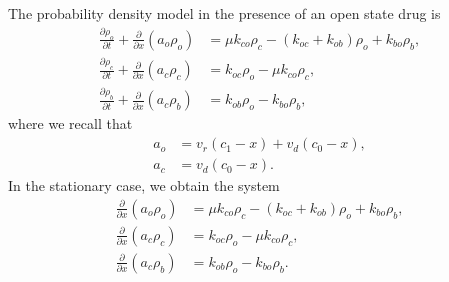 The probability density model in the presence of an open state drug is
\begin{align}
\frac{\partial\rho_{o}}{\partial t}+\frac{\partial}{\partial x}\left(
a_{o}\rho_{o}\right)   &  =\mu k_{co}\rho_{c}-(k_{oc}+k_{ob})\rho_{o}+k_{bo}\rho_{b},\\
\frac{\partial\rho_{c}}{\partial t}+\frac{\partial}{\partial x}\left(
a_{c}\rho_{c}\right)   &  =k_{oc}\rho_{o}-\mu k_{co}\rho_{c},\\
\frac{\partial\rho_{b}}{\partial t}+\frac{\partial}{\partial x}\left(
a_{c}\rho_{b}\right)   &  =k_{ob}\rho_{o}-k_{bo}\rho_{b},
\end{align}
where we recall that 
\begin{align*}
a_{o} &  =v_{r}(c_{1}-x)+v_{d}(c_{0}-x),\\
a_{c} &  =v_{d}(c_{0}-x).
\end{align*}
In the stationary case, we obtain the system%
\begin{align}
\frac{\partial}{\partial x}\left(
a_{o}\rho_{o}\right)   &  =\mu k_{co}\rho_{c}-(k_{oc}+k_{ob})\rho_{o}+k_{bo}\rho_{b},\\
\frac{\partial}{\partial x}\left(
a_{c}\rho_{c}\right)   &  =k_{oc}\rho_{o}-\mu k_{co}\rho_{c},\\
\frac{\partial}{\partial x}\left(
a_{c}\rho_{b}\right)   &  =k_{ob}\rho_{o}-k_{bo}\rho_{b}.
\end{align}
\begin{comment}
and in Figure \ref{1D/openblock_pdf.pdf} we show numerical solutions of this system using three values
of the control parameter $k_{bo}$.  For the closed state blocker we observed a monotonic improvement of the drug as the control parameter $k_{bc}$ increased. This is not the case for the open state blocker. The drug has effect for the mutant but not nearly as good effect as we observed for the closed state blocker. In Figure \ref{1D/openblock_pdf_zoom.pdf} we show the result for high concentrations using lower values of $k_{bo}$.

\fig{1D/openblock_pdf.pdf}{Open blocker using the characterization (\ref{kob}). Unlike the closed blocker case, the drug does not improve monotonically with increasing rates.}

\fig{1D/openblock_pdf_zoom.pdf}{Results at high concentration for three different open state blockers.}

We observed that the open state blockers computed based on the relation (\ref{kob}) does not give very good results. Another approach to this problem is to reconsider the system 
\begin{align}
\frac{\partial}{\partial x}\left(
a_{o}\rho_{o}\right)   &  =\mu k_{co}\rho_{c}-(k_{oc}+k_{ob})\rho_{o}+k_{bo}\rho_{b},\\
\frac{\partial}{\partial x}\left(
a_{c}\rho_{c}\right)   &  =k_{oc}\rho_{o}-\mu k_{co}\rho_{c},\\
\frac{\partial}{\partial x}\left(
a_{c}\rho_{b}\right)   &  =k_{ob}\rho_{o}-k_{bo}\rho_{b},
\end{align}
\end{comment}
